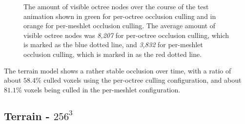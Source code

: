   \begin{figure}[h]            %
    \begin{center}
      \caption{The amount of visible octree nodes over the course of the test animation shown in green for 
      per-octree occlusion culling and in orange for per-meshlet occlusion culling. 
      The average amount of visible octree nodes was \emph{8,207} for per-octree occlusion culling, which is 
      marked as the blue dotted line, and \emph{3,832} for per-meshlet occlusion culling, which is marked in 
      as the red dotted line.}
      \label{plt:terrain-256-culling-res-nodes}
    \end{center}
  \end{figure}



\noindent
The terrain model shows a rather stable occlusion over time, with a ratio of about $58.4\%$ culled voxels 
using the per-octree culling configuration, and about $81.1\%$ voxels being culled in the per-meshlet 
configuration. 



\subsection*{Terrain - $256^3$}


